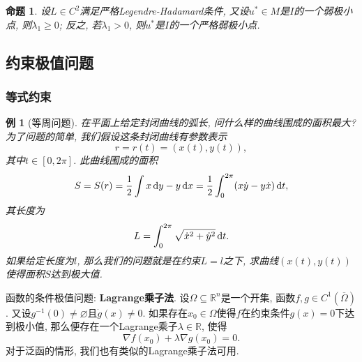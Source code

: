 \documentclass[12pt,a4paper]{article}
\newtheorem{proposition}[theorem]{命题}
\newtheorem{example}[theorem]{例}
\begin{document}
\begin{proposition}
    设$L \in C^2$满足严格Legendre-Hadamard条件, 又设$u^* \in M$是$I$的一个弱极小点, 则$\lambda_1 \geq 0$;
    反之, 若$\lambda_1 > 0$, 则$u^*$是$I$的一个严格弱极小点.
\end{proposition}

\subsection{约束极值问题}

\subsubsection{等式约束}

\begin{example}[等周问题]
    在平面上给定封闭曲线的弧长, 问什么样的曲线围成的面积最大? 为了问题的简单, 我们假设这条封闭曲线有参数表示
    \begin{equation*}
        r = r(t) = (x(t), y(t)),
    \end{equation*}
    其中$t \in [0, 2\pi]$. 此曲线围成的面积 
    \begin{equation*}
        S = S(r)= \frac{1}{2}\int x \,{\rm d}y - y \,{\rm d}x = \frac{1}{2}\int_0^{2\pi}(x\dot y - y\dot x) \,{\rm d}t, 
    \end{equation*}
    其长度为 
    \begin{equation*}
        L = \int_0^{2\pi}\sqrt{\dot x^2 + \dot y^2} \,{\rm d}t.
    \end{equation*}
    如果给定长度为$l$, 那么我们的问题就是在约束$L = l$之下, 求曲线$(x(t), y(t))$使得面积$S$达到极大值.
\end{example}

函数的条件极值问题: \textbf{Lagrange乘子法}. 设$\Omega \subseteq \mathbb{R}^n$是一个开集, 函数$f, g \in C^1(\overline{\Omega})$.
又设$g^{-1}(0) \neq \varnothing$且$\dot g(x) \neq 0$. 如果存在$x_0 \in \Omega$使得$f$在约束条件$g(x) = 0$下达到极小值, 那么便存在一个Lagrange乘子$\lambda \in \mathbb{R}$, 使得 
\begin{equation*}
    \nabla f(x_0) + \lambda\nabla g(x_0) = 0.
\end{equation*}
对于泛函的情形, 我们也有类似的Lagrange乘子法可用.
\end{document}
